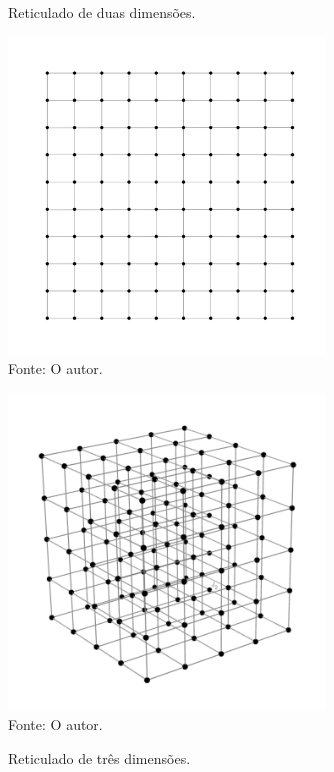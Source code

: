     \begin{figure}[htb!]
        \begin{minipage}[c]{0.5\linewidth}
            \centering
            \caption{Reticulado de duas dimensões.}
            \includegraphics[width=0.75\textwidth]{Figuras/lattice-2d.png}\\
            \footnotesize{Fonte: O autor.}
            \label{fig:lattice-2d}
        \end{minipage}\hfill
        \begin{minipage}[c]{0.5\linewidth}
            \centering
            \caption{Reticulado de três dimensões.}
            \includegraphics[width=0.75\textwidth]{Figuras/lattice-3d.png}\\
            \footnotesize{Fonte: O autor.}
            \label{fig:lattice-3d}
        \end{minipage}
    \end{figure}


